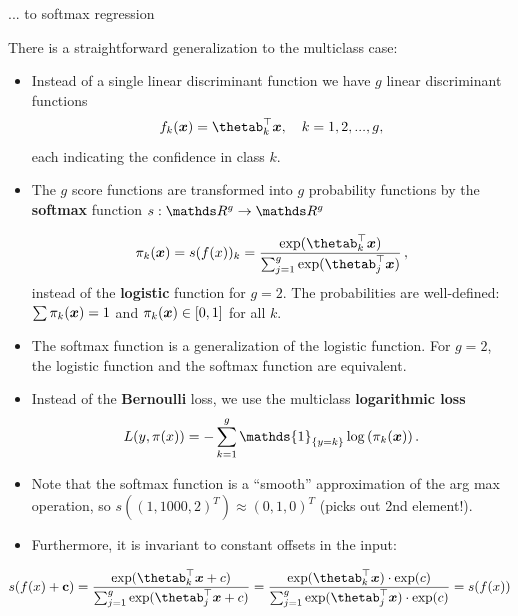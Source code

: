 \begin{vbframe}{... to softmax regression} 

There is a straightforward generalization to the multiclass case: 

\begin{itemize}
  \item Instead of a single linear discriminant function we have $g$ linear discriminant functions
    $$
      f_k(\xv) = \thetab_k^\top \xv, \quad k = 1, 2, ..., g,
    $$
  each indicating the confidence in class $k$.
  \item The $g$ score functions are transformed into $g$ probability functions by the \textbf{softmax} function $s:\R^g \to \R^g$ 

  $$
    \pi_k(\xv) = s(\fx)_k = \frac{\exp(\thetab_k^\top \xv)}{\sum_{j = 1}^g \exp(\thetab_j^\top \xv) }\,,
  $$
  instead of the \textbf{logistic} function for $g = 2$. The probabilities are well-defined: $\sum \pi_k(\bm{x}) = 1$ and $\pi_k(\bm{x}) \in [0, 1]$ for all $k$. 

  \item The softmax function is a generalization of the logistic function. For $g = 2$, the logistic function and the softmax function are equivalent. 

  \item Instead of the \textbf{Bernoulli} loss, we use the multiclass \textbf{logarithmic loss}
   $$
    L(y, \pix) = - \sum_{k = 1}^g \mathds{1}_{\{y = k\}} \log\left(\pi_k(\xv)\right).
  $$ 
    \item Note that the softmax function is a \enquote{smooth} approximation of the arg max operation,
        so $s((1, 1000, 2)^T) \approx (0, 1, 0)^T$ (picks out 2nd element!).  
    \item Furthermore, it is invariant to constant offsets in the input:  
      \end{itemize}
    $$ 
    s(\fx + \mathbf{c}) = \frac{\exp(\thetab_k^\top \xv + c)}{\sum_{j = 1}^g \exp(\thetab_j^\top \xv + c)} = 
    \frac{\exp(\thetab_k^\top \xv)\cdot \exp(c)}{\sum_{j = 1}^g \exp(\thetab_j^\top \xv) \cdot \exp(c)} = 
    s(\fx)
    $$  


\end{vbframe}

